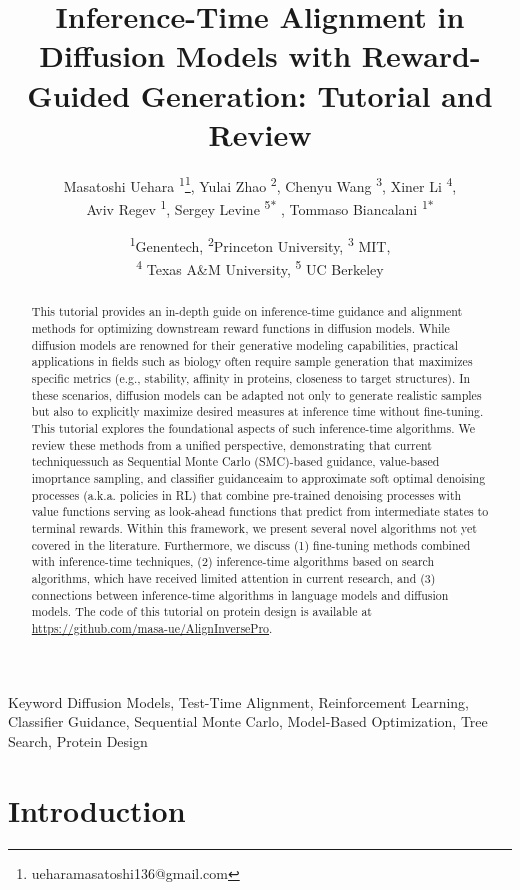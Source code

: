 \documentclass[12pt]{article} %
\title{Inference-Time Alignment in Diffusion Models with Reward-Guided Generation: Tutorial and Review}
\author{
    Masatoshi Uehara \textsuperscript{1}\thanks{ueharamasatoshi136@gmail.com}, 
  Yulai Zhao \textsuperscript{2},
 Chenyu Wang \textsuperscript{3},
 Xiner Li \textsuperscript{4},  \\ 
 Aviv Regev \textsuperscript{1}, 
 Sergey Levine \textsuperscript{5$*$} , 
Tommaso Biancalani \textsuperscript{1$*$} 
}
\date{
    \textsuperscript{1}Genentech, \textsuperscript{2}Princeton University,
    \textsuperscript{3} MIT,  \\ 
     \textsuperscript{4} Texas A\&M University, 
    \textsuperscript{5} UC Berkeley 
}
\begin{document}
\maketitle


\begin{abstract}
{
This tutorial provides an in-depth guide on inference-time guidance and alignment methods for optimizing downstream reward functions in diffusion models. While diffusion models are renowned for their generative modeling capabilities, practical applications in fields such as biology often require sample generation that maximizes specific metrics (e.g., stability, affinity in proteins, closeness to target structures). In these scenarios, diffusion models can be adapted not only to generate realistic samples but also to explicitly maximize desired measures at inference time without fine-tuning. This tutorial explores the foundational aspects of such inference-time algorithms. We review these methods from a unified perspective, demonstrating that current techniques\textemdash such as Sequential Monte Carlo (SMC)-based guidance, value-based imoprtance sampling, and classifier guidance\textemdash aim to approximate soft optimal denoising processes (a.k.a. policies in RL) that combine pre-trained denoising processes with value functions serving as look-ahead functions that predict from intermediate states to terminal rewards. Within this framework, we present several novel algorithms not yet covered in the literature. Furthermore, we discuss (1) fine-tuning methods combined with inference-time techniques, (2) inference-time algorithms based on search algorithms, which have received limited attention in current research, and (3) connections between inference-time algorithms in language models and diffusion models. The code of this tutorial on protein design is available at \href{https://github.com/masa-ue/AlignInversePro}{https://github.com/masa-ue/AlignInversePro}. 

 } 
\end{abstract}

\begin{keyword}{Keyword} Diffusion Models, Test-Time Alignment, Reinforcement Learning, Classifier Guidance, Sequential Monte Carlo, Model-Based Optimization, Tree Search, Protein Design
\end{keyword}


\newpage 
\section*{Introduction}
\end{document}
